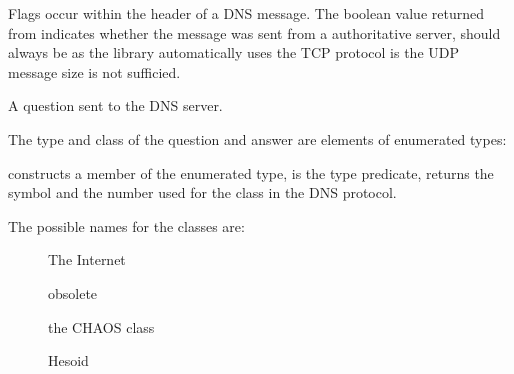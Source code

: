 \begin{desc}
  Flags occur within the header of a DNS message. The boolean value
  returned from  indicates whether the message
  was sent from a authoritative server,  should
  always be \sharpf as the library automatically uses the TCP protocol
  is the UDP message size is not sufficied.
\end{desc}

\begin{desc}
  A question sent to the DNS server.
\end{desc}
The type and class of the question and answer are elements of
enumerated types:
\begin{desc}
   constructs a member of the enumerated type,
   is the type predicate, 
  returns the symbol and  the number used for
  the class in the DNS protocol.
\end{desc}
The possible names for the classes are:
\begin{description}
\item[] The Internet
\item[] obsolete
\item[] the CHAOS class
\item[] Hesoid
\end{description}

